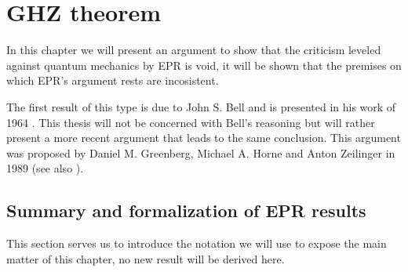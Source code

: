 \chapter{GHZ theorem}
\label{chap:ghz-theorem}
In this chapter we will present an argument to show that the criticism leveled against quantum mechanics by EPR is void, it will be shown that the premises on which EPR's argument rests are incosistent.

The first result of this type is due to John S. Bell and is presented in his work of 1964 \cite{Bell1964}. This thesis will not be concerned with Bell's reasoning but will rather present a more recent argument that leads to the same conclusion. This argument was proposed by Daniel M. Greenberg, Michael A. Horne and Anton Zeilinger in 1989 \cite{ghz1989} (see also \cite{:/content/aapt/journal/ajp/58/12/10.1119/1.16243}).


\section{Summary and formalization of EPR results}

This section serves us to introduce the notation we will use to expose the main matter of this chapter, no new result will be derived here.

